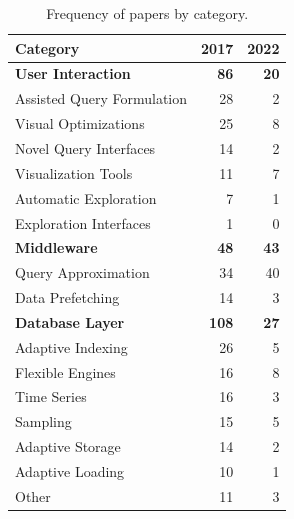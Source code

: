 \begin{table}[hptb]
  \small
  \begin{tabularx}{\textwidth}{X r r} \hline
    \textbf{Category} & \textbf{2017} & \textbf{2022} \\ \hline
    \textbf{User Interaction}                   & \textbf{86} & \textbf{20} \\
      \hspace{0.5em} Assisted Query Formulation & 28 & 2 \\
      \hspace{0.5em} Visual Optimizations       & 25 & 8 \\
      \hspace{0.5em} Novel Query Interfaces     & 14 & 2 \\
      \hspace{0.5em} Visualization Tools        & 11 & 7 \\
      \hspace{0.5em} Automatic Exploration      &  7 & 1 \\
      \hspace{0.5em} Exploration Interfaces     &  1 & 0 \\
    \textbf{Middleware}                         & \textbf{48} & \textbf{43} \\
      \hspace{0.5em} Query Approximation        & 34 & 40 \\
      \hspace{0.5em} Data Prefetching           & 14 &  3 \\
    \textbf{Database Layer}                     & \textbf{108} & \textbf{27} \\
      \hspace{0.5em} Adaptive Indexing          & 26 & 5 \\
      \hspace{0.5em} Flexible Engines           & 16 & 8 \\
      \hspace{0.5em} Time Series                & 16 & 3 \\
      \hspace{0.5em} Sampling                   & 15 & 5 \\
      \hspace{0.5em} Adaptive Storage           & 14 & 2 \\
      \hspace{0.5em} Adaptive Loading           & 10 & 1 \\
      \hspace{0.5em} Other                      & 11 & 3
  \end{tabularx}
  \caption{Frequency of  papers by category.}\label{tab:mapping/category_summary}
\end{table}

